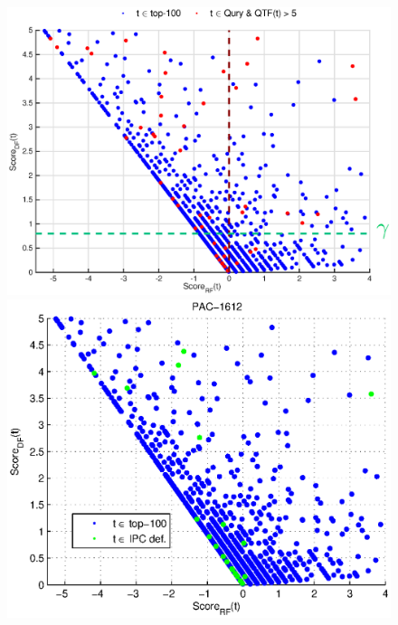 \documentclass{sig-alternate}
\begin{document}
\begin{figure}[htpb]
\begin{center}
\noindent\begin{minipage}[b]{0.52\linewidth}
\includegraphics[width=\linewidth]{figs/df-rf-tauline.eps}
\end{minipage}%
\hfill
\begin{minipage}[b]{0.48\linewidth}
\includegraphics[width=\linewidth]{figs/ipcdef-rf-df.eps}
\end{minipage}

\end{center}
\end{figure}
\end{document}
